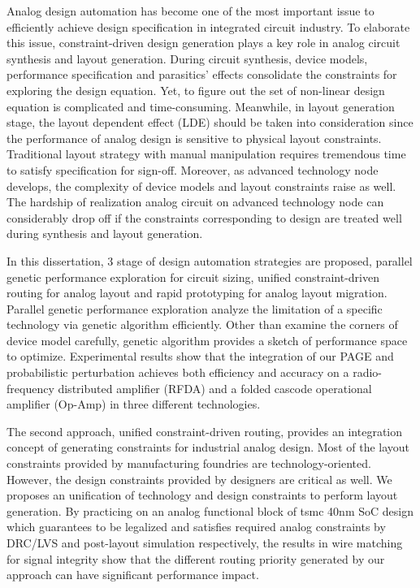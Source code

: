 
Analog design automation has become one of the most important issue to efficiently achieve design specification in integrated circuit industry. To elaborate this issue, constraint-driven design generation plays a key role in analog circuit synthesis and layout generation. During circuit synthesis, device models, performance specification and parasitics' effects consolidate the constraints for exploring the design equation. Yet, to figure out the set of non-linear design equation is complicated and time-consuming. Meanwhile, in layout generation stage, the layout dependent effect (LDE) should be taken into consideration since the performance of analog design is sensitive to physical layout constraints. Traditional layout strategy with manual manipulation requires tremendous time to satisfy specification for sign-off. Moreover, as advanced technology node develops, the complexity of device models and layout constraints raise as well. The hardship of realization analog circuit on advanced technology node can considerably drop off if the constraints corresponding to design are treated well during synthesis and layout generation.

In this dissertation, 3 stage of design automation strategies are proposed, parallel genetic performance exploration for circuit sizing, unified constraint-driven routing for analog layout and rapid prototyping for analog layout migration. Parallel genetic performance exploration analyze the limitation of a specific technology via genetic algorithm efficiently. Other than examine the corners of device model carefully, genetic algorithm provides a sketch of performance space to optimize. Experimental results show that the integration of our PAGE and probabilistic perturbation achieves both efficiency and accuracy on a radio-frequency distributed amplifier (RFDA) and a folded cascode operational amplifier (Op-Amp) in three different technologies.

The second approach, unified constraint-driven routing, provides an integration concept of generating constraints for industrial analog design. Most of the layout constraints provided by manufacturing foundries are technology-oriented. However, the design constraints provided by designers are critical as well. We proposes an unification of technology and design constraints to perform layout generation. By practicing on an analog functional block of tsmc 40nm SoC design which guarantees to be legalized and satisfies required analog constraints by DRC/LVS and post-layout simulation respectively, the results in wire matching for signal integrity show that the different routing priority generated by our approach can have significant performance impact.


